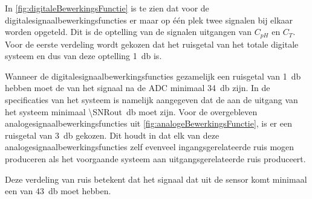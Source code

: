 In \cref{fig:digitaleBewerkingsFunctie} is te zien dat voor de digitalesignaalbewerkingsfuncties er maar op één plek twee signalen bij elkaar worden opgeteld. Dit is de optelling van de signalen uitgangen van $C_{pH}$ en $C_T$. Voor de eerste verdeling wordt gekozen dat het ruisgetal van het totale digitale systeem en dus van deze optelling \qty{1}{\decibel} is.

Wanneer de digitalesignaalbewerkingsfuncties gezamelijk een ruisgetal van \qty{1}{\decibel} hebben moet de \SNR van het signaal na de ADC minimaal \qty{34}{\decibel} zijn. In de specificaties van het systeem is namelijk aangegeven dat de \SNR aan de uitgang van het systeem minimaal \qty{\SNRout}{\decibel} moet zijn. Voor de overgebleven analogesignaalbewerkingsfuncties uit \cref{fig:analogeBewerkingsFunctie}, is er een ruisgetal van \qty{3}{\decibel} gekozen. Dit houdt in dat elk van deze analogesignaalbewerkingsfuncties zelf evenveel ingangsgerelateerde ruis mogen produceren als het voorgaande systeem aan uitgangsgerelateerde ruis produceert.

Deze verdeling van ruis betekent dat het signaal dat uit de sensor komt minimaal een \SNR van \qty{43}{\decibel} moet hebben.
















%
